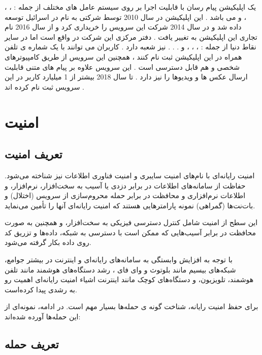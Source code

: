 \documentclass[12pt]{book}
\begin{document}
یک اپلیکیشن پیام رسان با قابلیت اجرا بر روی سیستم عامل های مختلف از جمله :
،
،
،
و
می باشد .
این اپلیکیشن در سال 2010 توسط شرکتی به نام
در اسرائیل توسعه داده شد و در سال 2014 شرکت
این سرویس را خریداری کرد و از سال 2016 نام تجاری این اپلیکیشن به 
تغییر یافت .
دفتر مرکزی این شرکت در 
واقع است اما در سایر نقاط دنیا از جمله :
،
،
،
و . . .
 نیز شعبه دارد .
کاربران می توانند با یک شماره ی تلفن همراه در این اپلیکیشن ثبت نام کنند ، همچنین این سرویس از طریق کامپیوترهای شخصی و 
هم قابل دسترسی است .
این سرویس علاوه بر پیام های متنی قابلیت ارسال عکس ها و ویدیوها را نیز دارد .
تا سال 2018 بیشتر از 1 میلیارد کاربر در این سرویس ثبت نام کرده اند .




\newpage
\chapter{امنیت}

\section{تعریف امنیت}

امنیت رایانه‌ای با نام‌های امنیت سایبری و امنیت فناوری اطلاعات نیز شناخته می‌شود. حفاظت از سامانه‌های اطلاعات در برابر دزدی یا آسیب به سخت‌افزار، نرم‌افزار، و اطلاعات نرم‌افزاری و محافظت در برابر حمله محروم‌سازی از سرویس (اختلال) و بات‌نت‌ها (گمراهی) نمونه پارامترهایی هستند که امنیت رایانه‌ای آنها را تأمین می‌نماید.

این سطح از امنیت شامل کنترل دسترسی فیزیکی به سخت‌افزار، و همچنین به صورت محافظت در برابر آسیب‌هایی که ممکن است با دسترسی به شبکه، داده‌ها و تزریق کد روی داده بکار گرفته می‌شود.

با توجه به افزایش وابستگی به سامانه‌های رایانه‌ای و اینترنت در بیشتر جوامع، شبکه‌های بیسیم مانند بلوتوث و وای فای ، رشد دستگاه‌های هوشمند مانند تلفن هوشمند، تلویزیون، و دستگاه‌های کوچک مانند اینترنت اشیاء امنیت رایانه‌ای اهمیت رو به رشدی پیدا کرده‌است. 

برای حفظ امنیت رایانه، شناخت گونه ی حمله‌ها بسیار مهم است. در ادامه، نمونه‌ای از این حمله‌ها آورده شده‌اند: 

\section{تعریف حمله}
\end{document}
